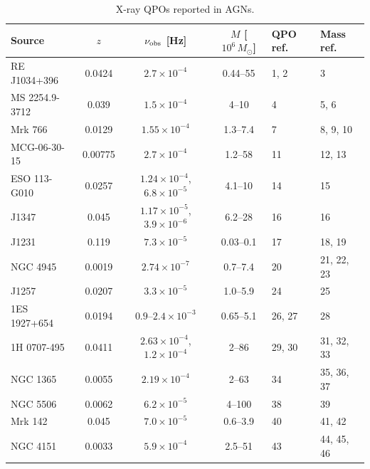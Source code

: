 \begin{table}
\caption{X-ray QPOs reported in AGNs.}
\label{tab:catalog}
\centering
\begin{tabular}{lcccll}
\hline\hline
Source & $z$ & $\nu_\textup{obs}$ [Hz] & $M$ [$10^6\,M_\odot$] & QPO ref. & Mass ref. \\
\hline
RE J1034+396           & 0.0424  & $2.7\times10^{-4}$                    & 0.44--55   & 1, 2   & 3 \\
MS 2254.9-3712         & 0.039   & $1.5\times10^{-4}$                    & 4--10      & 4      & 5, 6 \\
Mrk 766                & 0.0129  & $1.55\times10^{-4}$                   & 1.3--7.4   & 7      & 8, 9, 10 \\
MCG-06-30-15           & 0.00775 & $2.7\times10^{-4}$                    & 1.2--58    & 11     & 12, 13 \\
ESO 113-G010           & 0.0257  & $1.24\times10^{-4}$, $6.8\times10^{-5}$ & 4.1--10  & 14     & 15 \\
J1347  & 0.045   & $1.17\times10^{-5}$, $3.9\times10^{-6}$ & 6.2--28  & 16     & 16 \\
J1231 & 0.119   & $7.3\times10^{-5}$                    & 0.03--0.1  & 17     & 18, 19 \\
NGC 4945               & 0.0019  & $2.74\times10^{-7}$                   & 0.7--7.4  & 20     & 21, 22, 23 \\
J1257                  & 0.0207  & $3.3\times10^{-5}$                    & 1.0--5.9  & 24     & 25 \\
1ES 1927+654           & 0.0194  & $0.9$--$2.4\times10^{-3}$             & 0.65--5.1 & 26, 27 & 28 \\
1H 0707-495            & 0.0411  & $2.63\times10^{-4}$, $1.2\times10^{-4}$ & 2--86    & 29, 30 & 31, 32, 33 \\
NGC 1365               & 0.0055  & $2.19\times10^{-4}$                   & 2--63      & 34     & 35, 36, 37 \\
NGC 5506               & 0.0062  & $6.2\times10^{-5}$                    & 4--100     & 38     & 39 \\
Mrk 142                & 0.045   & $7.0\times10^{-5}$                    & 0.6--3.9   & 40     & 41, 42 \\
NGC 4151               & 0.0033  & $5.9\times10^{-4}$                    & 2.5--51    & 43     & 44, 45, 46 \\
\hline
\end{tabular}
\end{table}
